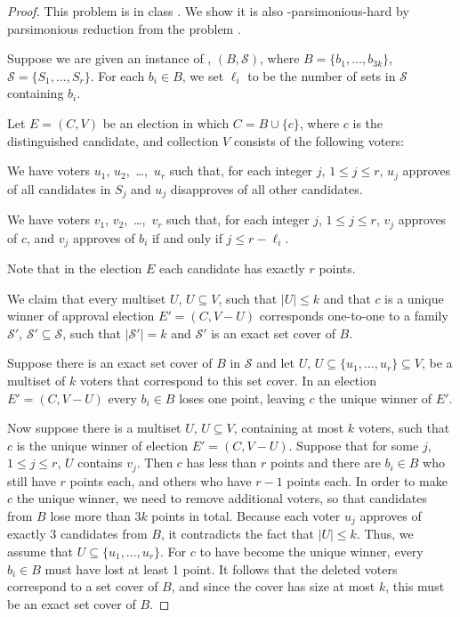 \begin{proof}
This problem is in class \sharpPclass.
We show it is also \sharpPclass-parsimonious-hard by parsimonious reduction from the problem \sharpXthreeC.

Suppose we are given an instance of \sharpXthreeC, $(B,\mathcal{S})$, where $B=\{b_1,\dots,b_{3k}\}$, $\mathcal{S}=\{S_1,\dots,S_r\}$.
For each $b_i\in B$, we set $\ell_i$ to be the number of sets in $\mathcal{S}$ containing $b_i$.

Let $E=(C,V)$ be an election in which $C=B\cup\{c\}$, where $c$ is the distinguished candidate, and collection $V$ consists of the following voters:
\begin{Enumerate}
	\item We have voters $u_1$, $u_2$,~\dots,~$u_r$ such that, for each integer $j$, $1\le j\le r$, $u_j$ approves of all candidates in $S_j$ and $u_j$ disapproves of all other candidates.
	\item We have voters $v_1$, $v_2$,~\dots,~$v_r$ such that, for each integer $j$, $1\le j\le r$, $v_j$ approves of $c$, and $v_j$ approves of $b_i$ if and only if $j\le r-\ell_i$.
\end{Enumerate}
Note that in the election $E$ each candidate has exactly $r$ points.

We claim that every multiset $U$, $U\subseteq V$, such that $|U|\le k$ and that $c$ is a unique winner of approval election $E'=(C,V-U)$ corresponds one-to-one to a family $\mathcal{S'}$, $\mathcal{S'}\subseteq\mathcal{S}$, such that $|\mathcal{S'}|=k$ and $\mathcal{S'}$ is an exact set cover of $B$.

Suppose there is an exact set cover of $B$ in $\mathcal{S}$ and let $U$, $U\subseteq\{u_1,\dots,u_r\}\subseteq V$, be a multiset of $k$ voters that correspond to this set cover.
In an election $E'=(C,V-U)$ every $b_i\in B$ loses one point, leaving $c$ the unique winner of $E'$.

Now suppose there is a multiset $U$, $U\subseteq V$, containing at most $k$ voters, such that $c$ is the unique winner of election $E'=(C,V-U)$.
Suppose that for some $j$, $1\le j\le r$, $U$ contains $v_j$.
Then $c$ has less than $r$ points and there are $b_i\in B$ who still have $r$ points each, and others who have $r-1$ points each.
In order to make $c$ the unique winner, we need to remove additional voters, so that candidates from $B$ lose more than $3k$ points in total.
Because each voter $u_j$ approves of exactly 3 candidates from $B$, it contradicts the fact that $|U|\le k$.
Thus, we assume that $U\subseteq\{u_1,\dots,u_r\}$.
For $c$ to have become the unique winner, every $b_i\in B$ must have lost at least 1 point.
It follows that the deleted voters correspond to a set cover of $B$, and since the cover has size at most $k$, this must be an exact set cover of $B$.
\end{proof}

